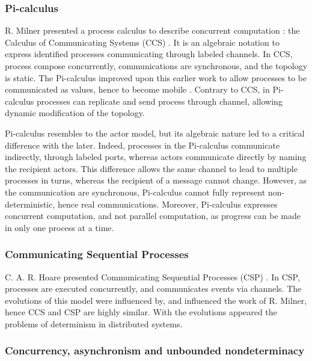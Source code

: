 \subsubsection{Pi-calculus}

R. Milner presented a process calculus to describe concurrent computation : the Calculus of Communicating Systems (CCS) \cite{Milner1975, Milner1980}.
It is an algebraic notation to express identified processes communicating through labeled channels.
In CCS, process compose concurrently, communications are synchronous, and the topology is static.
The Pi-calculus improved upon this earlier work to allow processes to be communicated as values, hence to become mobile \cite{Engberg1986,Milner1992a,Milner1992}.
Contrary to CCS, in Pi-calculus processes can replicate and send process through channel, allowing dynamic modification of the topology.

Pi-calculus resembles to the actor model, but its algebraic nature led to a critical difference with the later.
Indeed, processes in the Pi-calculus communicate indirectly, through labeled ports, whereas actors communicate directly by naming the recipient actors.
This difference allows the same channel to lead to multiple processes in turns, whereas the recipient of a message cannot change. 
However, as the communication are synchronous, Pi-calculus cannot fully represent non-deterministic, hence real communications.
Moreover, Pi-calculus expresses concurrent computation, and not parallel computation, as progress can be made in only one process at a time.


\subsubsection{Communicating Sequential Processes}

C. A. R. Hoare presented Communicating Sequential Processes (CSP) \cite{Hoare1978, Brookes1984}.
In CSP, processes are executed concurrently, and communicates events via channels.
The evolutions of this model were influenced by, and influenced the work of R. Milner, hence CCS and CSP are highly similar.
With the evolutions appeared the problems of determinism in distributed systems.\cite{Brookes1984}



\subsubsection{Concurrency, asynchronism and unbounded nondeterminacy}

